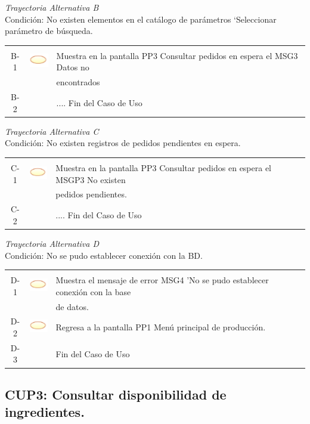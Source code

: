 \documentclass[10pt,spanish]{article}
\providecommand{\tabularnewline}{\\}
\begin{document}
	\textit{Trayectoria Alternativa B}\\
	Condición: No existen elementos en el catálogo de parámetros ‘Seleccionar parámetro de búsqueda.\\
	\begin{tabular}{ccl}
	& & \tabularnewline
	B-1 & \includegraphics{sistema} & Muestra en la pantalla PP3 Consultar pedidos en espera el MSG3 Datos no\tabularnewline
	& &  encontrados\tabularnewline
	B-2 & & .... Fin del Caso de Uso\tabularnewline
	\end{tabular}
	\newline
	\textit{Trayectoria Alternativa C}\\
	Condición: No existen registros de pedidos pendientes en espera.\\
	\begin{tabular}{ccl}
	& & \tabularnewline
	C-1 & \includegraphics{sistema} & Muestra en la pantalla PP3 Consultar pedidos en espera el MSGP3 No existen\tabularnewline
	& & pedidos pendientes.\tabularnewline
	C-2 & & .... Fin del Caso de Uso\tabularnewline
	\end{tabular}
	
	\textit{Trayectoria Alternativa D}\\
	Condición: No se pudo establecer conexión con la BD.\\
	\begin{tabular}{ccl}
	& & \tabularnewline
	D-1 & \includegraphics{sistema} & Muestra el mensaje de error MSG4 'No se pudo establecer conexión con la base\tabularnewline
	& & de datos.\tabularnewline
	D-2 & \includegraphics{sistema} & Regresa a la pantalla PP1 Menú principal de producción.\tabularnewline
	D-3 & & Fin del Caso de Uso\tabularnewline	
	\end{tabular}


\newpage
		\subsection{CUP3: Consultar disponibilidad de ingredientes.}
\end{document}
